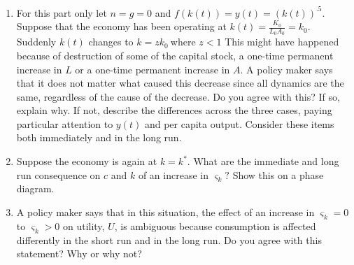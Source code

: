 \documentclass{article}
\begin{document}
\begin{enumerate}
\begin{enumerate}
\item For this part only let $n=g=0$ and $f\left( k\left( t\right) \right)
=y\left( t\right) =\left( k\left( t\right) \right) ^{.5}$. Suppose that the
economy has been operating at $k\left( t\right) =\frac{K_{0}}{L_{0}A_{0}}%
=k_{0}.$ Suddenly $k\left( t\right) $ changes to $k=zk_{0}\ $where $z<1$
This might have happened because of destruction of some of the capital
stock, a one-time permanent increase in $L$ or a one-time permanent increase
in $A$. A policy maker says that it does not matter what caused this
decrease since all dynamics are the same, regardless of the cause of the
decrease. Do you agree with this? If so, explain why. If not, describe the
differences across the three cases, paying particular attention to $y\left(
t\right) $ and per capita output. Consider these items both immediately and
in the long run.

\item Suppose the economy is again at $k=k^{\ast }.$ What are the immediate
and long run consequence on $c$ and $k$ of an increase in $\varsigma _{k}?$
Show this on a phase diagram.

\item A policy maker says that in this situation, the effect of an increase
in $\varsigma _{k}=0$ to $\varsigma _{k}>0$ on utility, $U$, is ambiguous
because consumption is affected differently in the short run and in the long
run. Do you agree with this statement? Why or why not?\pagebreak 
\end{enumerate}
\end{enumerate}
\end{document}
